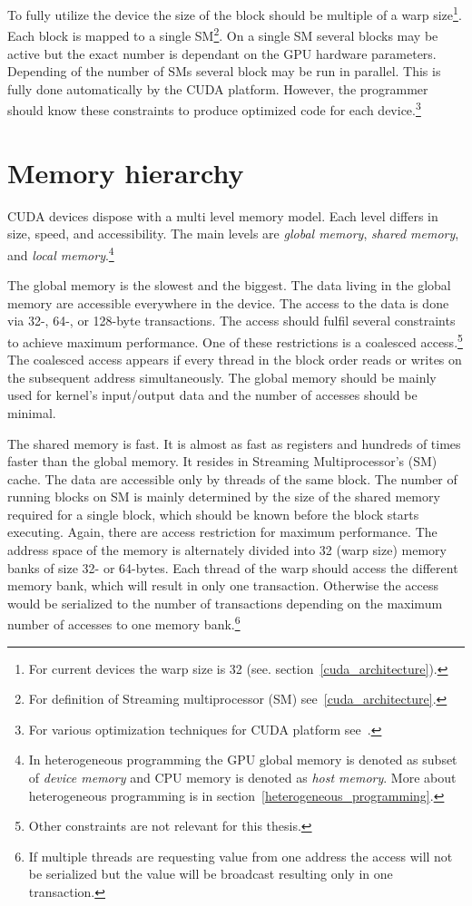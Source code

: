 \documentclass[12pt,twoside]{fithesis2}
\begin{document}
To fully utilize the device the size of the block should be multiple of a warp size\footnote{For current devices the warp size is 32 (see. section~\ref{cuda_architecture}).}. Each block is mapped to a single SM\footnote{For definition of Streaming multiprocessor (SM) see~\ref{cuda_architecture}.}. On a single SM several blocks may be active but the exact number is dependant on the GPU hardware parameters. Depending of the number of SMs several block may be run in parallel. This is fully done automatically by the CUDA platform. However, the programmer should know these constraints to produce optimized code for each device.\footnote{For various optimization techniques for CUDA platform see~\cite{cuda_best_practices}.}

\section{Memory hierarchy}
\label{memory_hiearchy}

CUDA devices dispose with a multi level memory model. Each level differs in size, speed, and accessibility. The main levels are \emph{global memory}, \emph{shared memory}, and \emph{local memory}.\footnote{In heterogeneous programming the GPU global memory is denoted as subset of \emph{device memory} and CPU memory is denoted as \emph{host memory}. More about heterogeneous programming is in section~\ref{heterogeneous_programming}.}~\cite{cuda_guide}

The global memory is the slowest and the biggest. The data living in the global memory are accessible everywhere in the device. The access to the data is done via 32-, 64-, or 128-byte transactions. The access should fulfil several constraints to achieve maximum performance. One of these restrictions is a coalesced access.\footnote{Other constraints are not relevant for this thesis.} The coalesced access appears if every thread in the block order reads or writes on the subsequent address simultaneously. The global memory should be mainly used for kernel's input/output data and the number of accesses should be minimal.

The shared memory is fast. It is almost as fast as registers and hundreds of times faster than the global memory. It resides in Streaming Multiprocessor's (SM) cache. The data are accessible only by threads of the same block. The number of running blocks on SM is mainly determined by the size of the shared memory required for a single block, which should be known before the block starts executing. Again, there are access restriction for maximum performance. The address space of the memory is alternately divided into 32 (warp size) memory banks of size 32- or 64-bytes. Each thread of the warp should access the different memory bank, which will result in only one transaction. Otherwise the access would be serialized to the number of transactions depending on the maximum number of accesses to one memory bank.\footnote{If multiple threads are requesting value from one address the access will not be serialized but the value will be broadcast resulting only in one transaction.}
\end{document}
